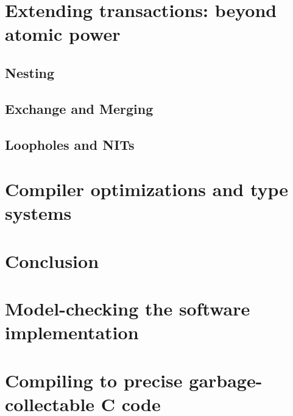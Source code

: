 \documentclass{phd-thesis}
\begin{document}
\chapter{Extending transactions: beyond atomic power}

\section{Nesting}
\section{Exchange and Merging}
\section{Loopholes and NITs}

\chapter{Compiler optimizations and type systems}

\chapter{Conclusion}
\appendix
\chapter{Model-checking the software implementation}


\chapter{Compiling to precise garbage-collectable C code}

\backmatter

\end{document}
